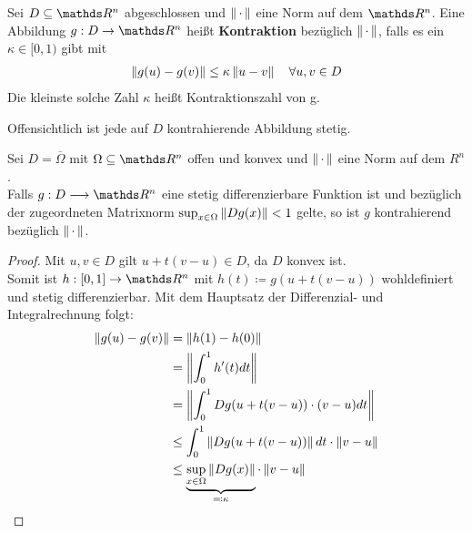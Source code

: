 \begin{Defe}
	Sei $D\subseteq  \R^n $ abgeschlossen und $\left\| \,\cdot\, \right\|$ eine Norm auf dem $\R^n$.
	Eine Abbildung $g:D\rightarrow \R^n $ heißt \textbf{Kontraktion} bezüglich  $\left\| \,\cdot\, \right\|$,
	falls es ein $\kappa \in [0,1)$ gibt mit
	\begin{gather*}
	\left\| g(u)-g(v) \right\| \leq \kappa \left\| u-v \right\| \quad \forall u,v\in D
	\end{gather*}
	Die kleinste solche Zahl $\kappa$ heißt Kontraktionszahl von g.
	
	\label{im5.2.2}
	
	Offensichtlich ist jede auf $D$ kontrahierende Abbildung stetig.
\end{Defe}  

\begin{Leme}
	\label{5.2.3}
	Sei $D=\overline{\Omega} $ mit $\Omega \subseteq \R^n$ offen und konvex
	und $\left\| \,\cdot\, \right\|$ eine Norm auf dem $R^n$.\\
	Falls $g:D\longrightarrow \R^n$ eine stetig differenzierbare Funktion ist und
	bezüglich der zugeordneten Matrixnorm $\sup_{x\in \Omega}\left\| Dg(x) \right\|<1$ gelte,
	so ist $g$ kontrahierend bezüglich  $\left\| \,\cdot\, \right\|$.
\end{Leme} 

\begin{proof}
	Mit $u,v \in D$ gilt $u+t(v-u)\in D$, da $D$ konvex ist. \\
	Somit ist $h:[0,1]\rightarrow \R^n $ mit $h(t) \coloneqq g(u+t(v-u))$ wohldefiniert
	und stetig differenzierbar. Mit dem Hauptsatz der Differenzial- und Integralrechnung
	folgt:
	\begin{align}\nonumber
	\left\| g(u)-g(v) \right\| & = \left\| h(1)-h(0) \right\|  \\ \nonumber
	& = \left\| \int_{0}^{1} h'(t) dt \right\| \\ \nonumber
	& = \left\| \int_{0}^{1} Dg(u+t(v-u))\cdot (v-u)dt \right\| \\ \nonumber
	& \leq \int_{0}^{1} \left\| Dg(u+t(v-u)) \right\|dt \cdot \left\| v-u \right\| \\
	& \leq \underbrace{\sup_{x\in\Omega}\left\| Dg(x) \right\|}_{\eqqcolon \kappa} 
	\cdot \left\| v-u \right\|
	\label{V.2.4}
	\end{align}
\end{proof}


